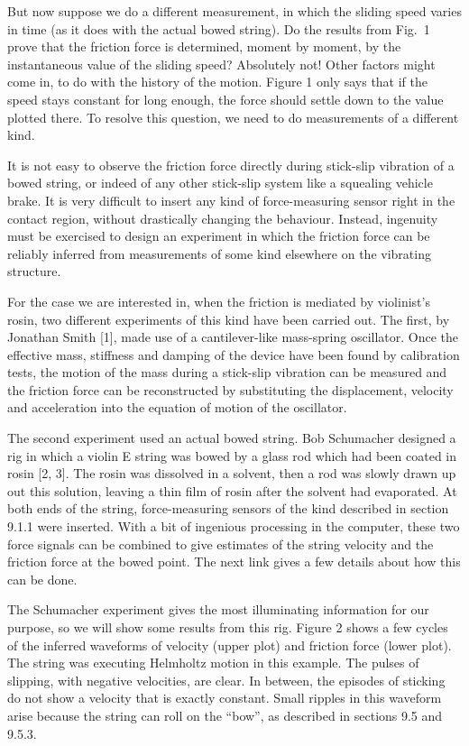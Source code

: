   But now suppose we do a different measurement, in which the sliding speed 
  varies in time (as it does with the actual bowed string). Do the results from 
  Fig.\ 1 prove that the friction force is determined, moment by moment, by the 
  instantaneous value of the sliding speed? Absolutely not! Other factors might 
  come in, to do with the history of the motion. Figure 1 only says that if the 
  speed stays constant for long enough, the force should settle down to the 
  value plotted there. To resolve this question, we need to do measurements of 
  a different kind. 

  It is not easy to observe the friction force directly during stick-slip 
  vibration of a bowed string, or indeed of any other stick-slip system like a 
  squealing vehicle brake. It is very difficult to insert any kind of 
  force-measuring sensor right in the contact region, without drastically 
  changing the behaviour. Instead, ingenuity must be exercised to design an 
  experiment in which the friction force can be reliably inferred from 
  measurements of some kind elsewhere on the vibrating structure. 

  For the case we are interested in, when the friction is mediated by 
  violinist’s rosin, two different experiments of this kind have been carried 
  out. The first, by Jonathan Smith [1], made use of a cantilever-like 
  mass-spring oscillator. Once the effective mass, stiffness and damping of the 
  device have been found by calibration tests, the motion of the mass during a 
  stick-slip vibration can be measured and the friction force can be 
  reconstructed by substituting the displacement, velocity and acceleration 
  into the equation of motion of the oscillator. 

  The second experiment used an actual bowed string. Bob Schumacher designed a 
  rig in which a violin E string was bowed by a glass rod which had been coated 
  in rosin [2, 3]. The rosin was dissolved in a solvent, then a rod was slowly 
  drawn up out this solution, leaving a thin film of rosin after the solvent 
  had evaporated. At both ends of the string, force-measuring sensors of the 
  kind described in section 9.1.1 were inserted. With a bit of ingenious 
  processing in the computer, these two force signals can be combined to give 
  estimates of the string velocity and the friction force at the bowed point. 
  The next link gives a few details about how this can be done. 

  The Schumacher experiment gives the most illuminating information for our 
  purpose, so we will show some results from this rig. Figure 2 shows a few 
  cycles of the inferred waveforms of velocity (upper plot) and friction force 
  (lower plot). The string was executing Helmholtz motion in this example. The 
  pulses of slipping, with negative velocities, are clear. In between, the 
  episodes of sticking do not show a velocity that is exactly constant. Small 
  ripples in this waveform arise because the string can roll on the “bow”, as 
  described in sections 9.5 and 9.5.3. 

